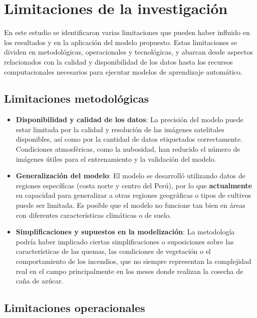 \section{Limitaciones de la investigación}
En este estudio se identificaron varias limitaciones que pueden haber influido en los resultados y en la aplicación del modelo propuesto. 
Estas limitaciones se dividen en metodológicas, operacionales y tecnológicas, y abarcan desde aspectos relacionados con la calidad y disponibilidad de 
los datos hasta los recursos computacionales necesarios para ejecutar modelos de aprendizaje automático.

\subsection{Limitaciones metodológicas}

\begin{itemize}
    \item \textbf{Disponibilidad y calidad de los datos}: La precisión del modelo puede estar limitada por la calidad y resolución de las imágenes 
    satelitales disponibles, así como por la cantidad de datos etiquetados correctamente. Condiciones atmosféricas, como la nubosidad, han
    reducido el número de imágenes útiles para el entrenamiento y la validación del modelo.

    \item \textbf{Generalización del modelo}: El modelo se desarrolló utilizando datos de regiones específicas (costa norte y centro del Perú), por lo que 
    \textbf{actualmente} su capacidad para generalizar a otras regiones geográficas o tipos de cultivos puede ser limitada. Es posible que el modelo no funcione tan bien en áreas con diferentes 
    características climáticas o de suelo.

    \item \textbf{Simplificaciones y supuestos en la modelización}: La metodología podría haber implicado ciertas simplificaciones o suposiciones sobre las características 
    de las quemas, las condiciones de vegetación o el comportamiento de los incendios, que no siempre representan la complejidad real en el campo principalmente en los
    meses donde realizan la cosecha de caña de azúcar.
\end{itemize}

\subsection{Limitaciones operacionales}

